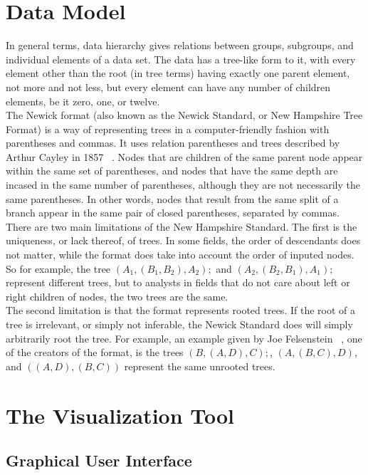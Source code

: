 \documentclass[journal, 9pt]{vgtc}                %
\begin{document}
\section{Data Model}

In general terms, data hierarchy gives relations between groups, subgroups, and individual elements of a data set. The data has a tree-like form to it, with every element other than the root (in tree terms)
having exactly one parent element, not more and not less, but every element can have any number of children elements, be it zero, one, or twelve.\\
The Newick format (also known as the Newick Standard, or New Hampshire Tree Format) is a way of representing trees in a computer-friendly fashion with parentheses and commas. It uses relation parentheses and
trees described by Arthur Cayley in 1857 ~\cite{newick}. Nodes that are children of the same parent node appear within the same set of parentheses,
and nodes that have the same depth are incased in the same number of parentheses, although they are not necessarily the same parentheses. In other words, nodes that result from the
same split of a branch appear in the same pair of closed parentheses, separated by commas.\\
There are two main limitations of the New Hampshire Standard. The first is the uniqueness, or lack thereof, of trees. In some fields, the order of descendants does not matter, while the format does
take into account the order of inputed nodes. So for example, the tree $(A_1,(B_1,B_2),A_2);$ and $(A_2,(B_2,B_1),A_1);$ represent different trees, but to analysts in fields that do not care about left or right
children of nodes, the two trees are the same.\\
The second limitation is that the format represents rooted trees. If the root of a tree is irrelevant, or simply not inferable, the Newick Standard does will simply arbitrarily root the tree.
For example, an example given by Joe Felsenstein ~\cite{newick}, one of the creators of the format, is the trees $(B,(A,D),C);$, $(A,(B,C),D)$, and $((A,D),(B,C))$ represent the same unrooted trees.\\

\section{The Visualization Tool}

\subsection{Graphical User Interface}
\end{document}
